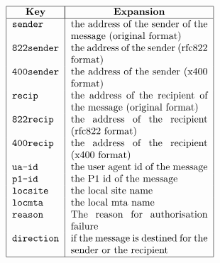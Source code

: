 \[\begin{tabular} {|l|p{0.4\textwidth}|}
\hline
	\multicolumn{1}{|c|}{\bf Key} & 
		\multicolumn{1}{|c|}{\bf Expansion} \\
\hline
	\tt sender & 
		the address of the sender of the message (original format) \\
	\tt 822sender & 
		the address of the sender (rfc822 format) \\
	\tt 400sender & 
		the address of the sender (x400 format) \\
	\tt recip & 
		the address of the recipient of the message (original format) \\ 
	\tt 822recip & 
		the address of the recipient (rfc822 format) \\
	\tt 400recip & 
		the address of the recipient (x400 format) \\
	\tt ua-id & 
		the user agent id of the message \\
	\tt p1-id & 
		the P1 id of the message \\
	\tt locsite &
		the local site name \\
	\tt locmta &
		the local mta name \\
	\tt reason & The reason for authorisation failure\\
	\tt direction & if the message is destined for the sender or
the recipient \\
\hline
\end{tabular}\]
